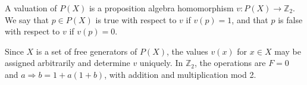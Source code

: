 A valuation of $P(X)$ is a proposition algebra homomorphism $v: P(X) \rightarrow \mathbb{Z}_2$. We say that $p \in P(X)$ is true with respect to $v$ if $v(p) = 1$, and that $p$ is false with respect to $v$ if $v(p) = 0$.

Since $X$ is a set of free generators of $P(X)$, the values $v(x)$ for $x \in X$ may be assigned arbitrarily and determine $v$ uniquely. In $\mathbb{Z}_2$, the operations are $F = 0$ and $a \Rightarrow b = 1 + a(1 + b)$, with addition and multiplication mod 2.
